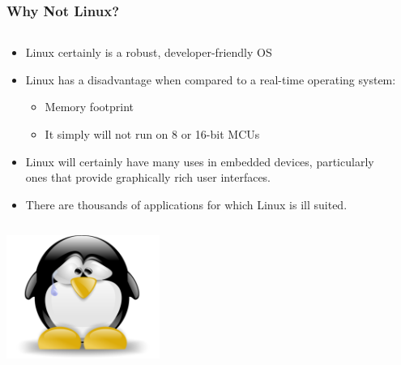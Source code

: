 \documentclass{beamer}
\begin{document}
\begin{frame}
	\frametitle{Why Not Linux?}
	\begin{columns}[c]
		\begin{column}{30cm}
			\vspace{.1cm}
			\begin{itemize}
				\justifying
				\item Linux certainly is a robust, developer-friendly OS
				\item Linux has a disadvantage when compared to a real-time operating system:
				\begin{itemize}
					\justifying
					\item Memory footprint
					\item It simply will not run on 8 or 16-bit MCUs
				\end{itemize}
				\item Linux will certainly have many uses in embedded devices, particularly\\
				ones that provide graphically rich user interfaces.
				\item There are thousands of applications for which Linux is ill suited.
			\end{itemize}
		\end{column}
	\end{columns}
	\vspace{.5cm}
	\hspace*{5.5cm} \includegraphics[width=5cm]{figs/tux-sad.png}
\end{frame}
\end{document}
